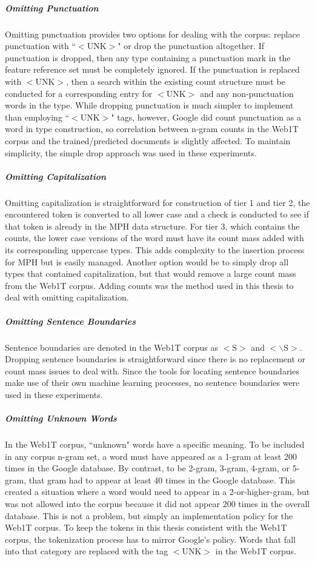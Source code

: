 			\subparagraph{Omitting Punctuation} Omitting punctuation provides two options for dealing with the corpus: replace punctuation with ``$<\text{UNK}>$" or drop the punctuation altogether.  If punctuation is dropped, then any type containing a punctuation mark in the feature reference set must be completely ignored.  If the punctuation is replaced with $<\text{UNK}>$, then a search within the existing count structure must be conducted for a corresponding entry for $<\text{UNK}>$ and any non-punctuation words in the type.  While dropping punctuation is much simpler to implement than employing ``$<\text{UNK}>$" tags, however, Google did count punctuation as a word in type construction, so correlation between n-gram counts in the Web1T corpus and the trained/predicted documents is slightly affected. To maintain simplicity, the simple drop approach was used in these experiments.
			\subparagraph{Omitting Capitalization} Omitting capitalization is straightforward for construction of tier 1 and tier 2, the encountered token is converted to all lower case and a check is conducted to see if that token is already in the MPH data structure.  For tier 3, which contains the counts, the lower case versions of the word must have its count mass added with its corresponding uppercase types.  This adds complexity to the insertion process for MPH but is easily managed.  Another option would be to simply drop all types that contained capitalization, but that would remove a large count mass from the Web1T corpus.  Adding counts was the method used in this thesis to deal with omitting capitalization.
			\subparagraph{Omitting Sentence Boundaries}  Sentence boundaries are denoted in the Web1T corpus as $<\text{S}>$ and $<\backslash \text{S}>$. Dropping sentence boundaries is straightforward since there is no replacement or count mass issues to deal with.  Since the tools for locating sentence boundaries make use of their own machine learning processes, no sentence boundaries were used in these experiments.
			\subparagraph{Omitting Unknown Words} In the Web1T corpus, ``unknown" words have a specific meaning.  To be included in any corpus n-gram set, a word must have appeared as a 1-gram at least 200 times in the Google database.  By contrast, to be 2-gram, 3-gram, 4-gram, or 5-gram, that gram had to appear at least 40 times in the Google database.  This created a situation where a word would need to appear in a 2-or-higher-gram, but was not allowed into the corpus because it did not appear 200 times in the overall database.  This is not a problem, but simply an implementation policy for the Web1T corpus.  To keep the tokens in this thesis consistent with the Web1T corpus, the tokenization process has to mirror Google's policy.  Words that fall into that category are replaced with the tag $<\text{UNK}>$ in the Web1T corpus.  %
		
